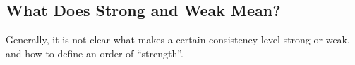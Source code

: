 \subsection{What Does Strong and Weak Mean?}
Generally, it is not clear what makes a certain consistency level strong or
weak, and how to define an order of ``strength''.








